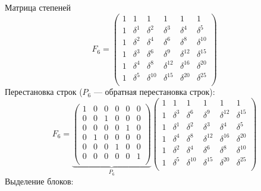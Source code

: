 Матрица степеней
\[
    F_6
    = \begin{pmatrix}
          1 & 1        & 1           & 1           & 1           & 1           \\
          1 & \delta^1 & \delta^2    & \delta^3    & \delta^4    & \delta^5    \\
          1 & \delta^2 & \delta^4    & \delta^6    & \delta^8    & \delta^{10} \\
          1 & \delta^3 & \delta^6    & \delta^9    & \delta^{12} & \delta^{15} \\
          1 & \delta^4 & \delta^8    & \delta^{12} & \delta^{16} & \delta^{20} \\
          1 & \delta^5 & \delta^{10} & \delta^{15} & \delta^{20} & \delta^{25} \\
    \end{pmatrix}
\]
Перестановка строк ($P_6$ --- обратная перестановка строк):
\[
    F_6
    =
    \underbrace{
        \begin{pmatrix}
            1 & 0 & 0 & 0 & 0 & 0 \\
            0 & 0 & 1 & 0 & 0 & 0 \\
            0 & 0 & 0 & 0 & 1 & 0 \\
            0 & 1 & 0 & 0 & 0 & 0 \\
            0 & 0 & 0 & 1 & 0 & 0 \\
            0 & 0 & 0 & 0 & 0 & 1 \\
        \end{pmatrix}
    }_{P_6}
    \begin{pmatrix}
        1 & 1        & 1           & 1           & 1           & 1           \\
        1 & \delta^3 & \delta^6    & \delta^9    & \delta^{12} & \delta^{15} \\
        1 & \delta^1 & \delta^2    & \delta^3    & \delta^4    & \delta^5    \\
        1 & \delta^4 & \delta^8    & \delta^{12} & \delta^{16} & \delta^{20} \\
        1 & \delta^2 & \delta^4    & \delta^6    & \delta^8    & \delta^{10} \\
        1 & \delta^5 & \delta^{10} & \delta^{15} & \delta^{20} & \delta^{25} \\
    \end{pmatrix}
\]
Выделение блоков:
